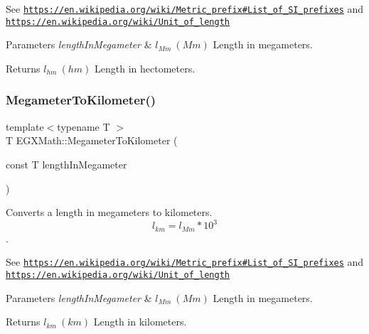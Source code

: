 See \href{https://en.wikipedia.org/wiki/Metric_prefix#List_of_SI_prefixes}{\tt https\+://en.\+wikipedia.\+org/wiki/\+Metric\+\_\+prefix\#\+List\+\_\+of\+\_\+\+S\+I\+\_\+prefixes} and \href{https://en.wikipedia.org/wiki/Unit_of_length}{\tt https\+://en.\+wikipedia.\+org/wiki/\+Unit\+\_\+of\+\_\+length} 
\begin{DoxyParams}{Parameters}
{\em length\+In\+Megameter} & $ l_{Mm}\ (Mm)$ Length in megameters. \\
\hline
\end{DoxyParams}
\begin{DoxyReturn}{Returns}
$ l_{hm}\ (hm)$ Length in hectometers. 
\end{DoxyReturn}
\mbox{\label{group___e_g_x_math-_conversions-_length_conversions-_s_i-_megameter-_s_i_gac428a2600cebd4a837801bef72380560}} 
\subsubsection{\texorpdfstring{Megameter\+To\+Kilometer()}{MegameterToKilometer()}}
{\footnotesize\ttfamily template$<$typename T $>$ \\
T E\+G\+X\+Math\+::\+Megameter\+To\+Kilometer (\begin{DoxyParamCaption}\item[{const T}]{length\+In\+Megameter }\end{DoxyParamCaption})}



Converts a length in megameters to kilometers. \[ l_{km}=l_{Mm} * 10^{3} \]. 

See \href{https://en.wikipedia.org/wiki/Metric_prefix#List_of_SI_prefixes}{\tt https\+://en.\+wikipedia.\+org/wiki/\+Metric\+\_\+prefix\#\+List\+\_\+of\+\_\+\+S\+I\+\_\+prefixes} and \href{https://en.wikipedia.org/wiki/Unit_of_length}{\tt https\+://en.\+wikipedia.\+org/wiki/\+Unit\+\_\+of\+\_\+length} 
\begin{DoxyParams}{Parameters}
{\em length\+In\+Megameter} & $ l_{Mm}\ (Mm)$ Length in megameters. \\
\hline
\end{DoxyParams}
\begin{DoxyReturn}{Returns}
$ l_{km}\ (km)$ Length in kilometers. 
\end{DoxyReturn}
\mbox{\label{group___e_g_x_math-_conversions-_length_conversions-_s_i-_megameter-_s_i_gadd3d707010ed78d623f4fbb5b8d72338}} 
